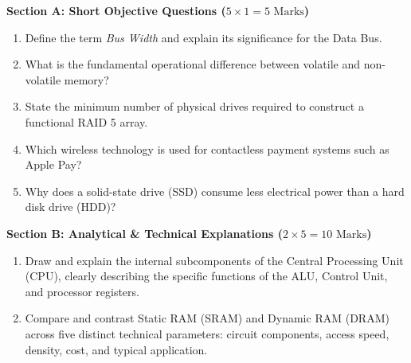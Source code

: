 \begin{chaptertest}
\noindent\textbf{Section A: Short Objective Questions ($5 \times 1 = 5\text{ Marks}$)}
\begin{enumerate}[leftmargin=1.5em]
    \item Define the term \textit{Bus Width} and explain its significance for the Data Bus.
    \item What is the fundamental operational difference between volatile and non-volatile memory?
    \item State the minimum number of physical drives required to construct a functional RAID 5 array.
    \item Which wireless technology is used for contactless payment systems such as Apple Pay?
    \item Why does a solid-state drive (SSD) consume less electrical power than a hard disk drive (HDD)?
\end{enumerate}

\medskip
\noindent\textbf{Section B: Analytical \& Technical Explanations ($2 \times 5 = 10\text{ Marks}$)}
\begin{enumerate}[leftmargin=1.5em, start=6]
    \item Draw and explain the internal subcomponents of the Central Processing Unit (CPU), clearly describing the specific functions of the ALU, Control Unit, and processor registers.
    \item Compare and contrast Static RAM (SRAM) and Dynamic RAM (DRAM) across five distinct technical parameters: circuit components, access speed, density, cost, and typical application.
\end{enumerate}


\end{chaptertest}

